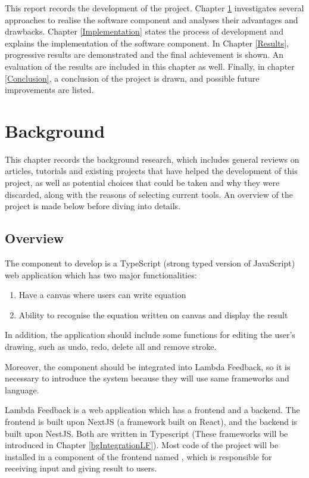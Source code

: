 \documentclass[12pt,twoside]{report}
\begin{document}
This report records the development of the project. Chapter \ref{Background}
investigates several approaches to realise the software component and analyses
their advantages and drawbacks. Chapter \ref{Implementation} states the process
of development and explains the implementation of the software component. In
Chapter \ref{Results}, progressive results are demonstrated and the final
achievement is shown. An evaluation of the results are included in this chapter
as well. Finally, in chapter \ref{Conclusion}, a conclusion of the project is drawn, and possible future improvements are listed.



\chapter{Background}
\label{Background}

This chapter records the background research, which includes general reviews on
articles, tutorials and existing projects that have helped the development of
this project, as well as potential choices that could be taken and why they were
discarded, along with the reasons of selecting current tools. An overview of the project is made below before diving into details.

\section*{Overview}
\label{bgOverview}

The component to develop is a TypeScript (strong typed version of JavaScript) web application which has two major functionalities:
\begin{enumerate}
    \item Have a canvas where users can write equation
    \item Ability to recognise the equation written on canvas and display the result
\end{enumerate}

In addition, the application should include some functions for editing the user's drawing, such as undo, redo, delete all and remove stroke.

Moreover, the component should be integrated into Lambda Feedback, so it is necessary to introduce the system because they will use same frameworks and language.

Lambda Feedback is a web application which has a frontend and a backend.
The frontend is built upon NextJS (a framework built on React), and the backend is built upon NestJS. Both
are written in Typescript (These frameworks will be introduced in Chapter \ref{bgIntegrationLF}). Most code of the project will be installed in a component of the frontend named , which is responsible for receiving input and giving result to users.
\end{document}
